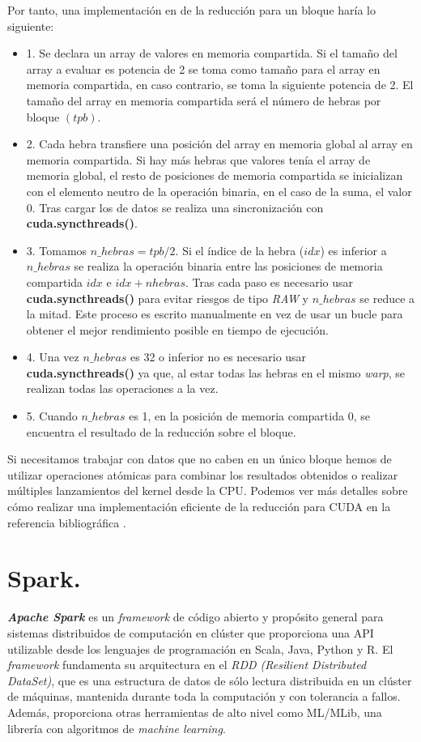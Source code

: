 Por tanto, una implementación en \cuda de la reducción para un bloque haría lo siguiente:
\begin{itemize}
  \item 1. Se declara un array de valores en memoria compartida. Si el tamaño del array a evaluar es potencia de 2 se toma como tamaño para el array en memoria compartida, en caso contrario, se toma la siguiente potencia de 2. El tamaño del array en memoria compartida será el número de hebras por bloque $(tpb)$.
  \item 2. Cada hebra transfiere una posición del array en memoria global al array en memoria compartida. Si hay más hebras que valores tenía el array de memoria global, el resto de posiciones de memoria compartida se inicializan con el elemento neutro de la operación binaria, en el caso de la suma, el valor 0. Tras cargar los de datos se realiza una sincronización con \textbf{cuda.syncthreads()}.
  \item 3. Tomamos $n\_hebras = tpb / 2$. Si el índice de la hebra ($idx$) es inferior a $n\_hebras$ se realiza la operación binaria entre las posiciones de memoria compartida $idx$ e $idx+nhebras$. Tras cada paso es necesario usar \textbf{cuda.syncthreads()} para evitar riesgos de tipo \textit{RAW} y $n\_hebras$ se reduce a la mitad. Este proceso es escrito manualmente en vez de usar un bucle para obtener el mejor rendimiento posible en tiempo de ejecución.
  \item 4. Una vez $n\_hebras$ es 32 o inferior no es necesario usar \textbf{cuda.syncthreads()} ya que, al estar todas las hebras en el mismo \textit{warp}, se realizan todas las operaciones a la vez.
  \item 5. Cuando $n\_hebras$ es 1, en la posición de memoria compartida 0, se encuentra el resultado de la reducción sobre el bloque.
\end{itemize}

Si necesitamos trabajar con datos que no caben en un único bloque hemos de utilizar operaciones atómicas para combinar los resultados obtenidos o realizar múltiples lanzamientos del kernel desde la CPU. Podemos ver más detalles sobre cómo realizar una implementación eficiente de la reducción para CUDA en la referencia bibliográfica \cite{reduction}.

\section{Spark.}
\textbf{\textit{Apache Spark}} es un \textit{framework} de código abierto y propósito general para sistemas distribuidos de computación en clúster que proporciona una API utilizable desde los lenguajes de programación en Scala, Java, Python y R. El \textit{framework} fundamenta su arquitectura en el \textit{RDD (Resilient Distributed DataSet)}, que es una estructura de datos de sólo lectura distribuida en un clúster de máquinas, mantenida durante toda la computación y con tolerancia a fallos. Además, proporciona otras herramientas de alto nivel como ML/MLib, una librería con algoritmos de \textit{machine learning}.\\

